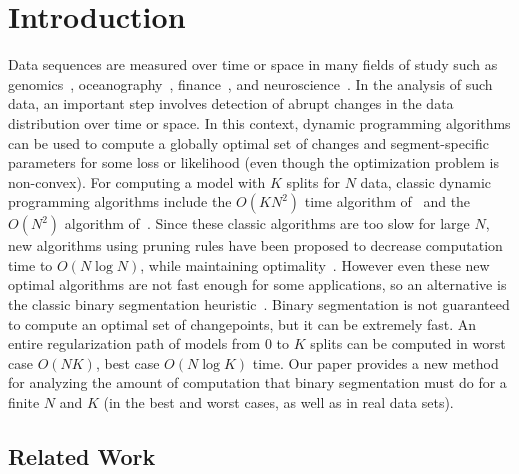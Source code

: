 \documentclass[algorithms,article,accept,oneauthor]{Definitions/mdpi}
\begin{document}
\section{Introduction}
\label{sec:introduction}



Data sequences are measured over time or space in many fields of study such as genomics~\citep{olshen2004circular}, oceanography~\citep{killick2010detection}, finance~\citep{fryzlewicz2014wild}, and neuroscience~\citep{Jewell2019}. 
In the analysis of such data, an important step involves detection of abrupt changes in the data distribution over time or space.
In this context, dynamic programming algorithms can be used to compute a globally optimal set of changes and segment-specific parameters for some loss or likelihood (even though the optimization problem is non-convex). 
For computing a model with $K$ splits for $N$ data, classic dynamic programming algorithms include the $O(K N^2)$ time algorithm of~\citet{segment-neighborhood} and the $O(N^2)$ algorithm of~\citet{Jackson2005}.
Since these classic algorithms are too slow for large $N$, new algorithms using pruning rules have been proposed to decrease computation time to $O(N\log N)$, while maintaining optimality~\citep{Maidstone2016}. 
However even these new optimal algorithms are not fast enough for some applications, so an alternative is the classic binary segmentation heuristic~\citep{binary-segmentation}.
Binary segmentation is not guaranteed to compute an optimal set of changepoints, but it can be extremely fast.
An entire regularization path of models from 0 to $K$ splits can be computed in worst case $O(N K)$, best case $O(N\log K)$ time.
Our paper provides a new method for analyzing the amount of computation that binary segmentation must do for a finite $N$ and $K$ (in the best and worst cases, as well as in real data sets).



\subsection{Related Work}
\label{sec:related-work}
\end{document}
